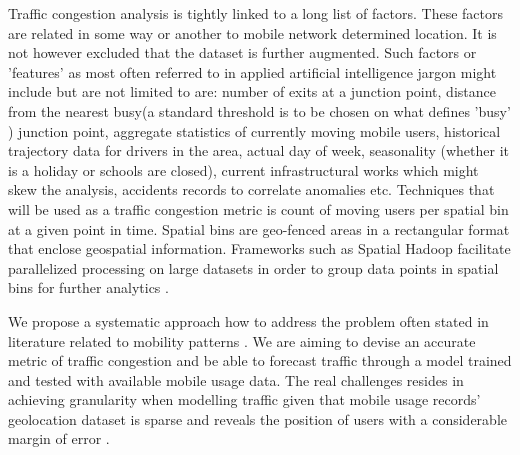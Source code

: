 \documentclass[12pt, a4paper]{report}
\theoremstyle{definition}
\theoremstyle{definition}%
\theoremstyle{definition}%
\theoremstyle{definition}%
\theoremstyle{definition}%
\theoremstyle{definition}%
\begin{document}
Traffic congestion analysis is tightly linked to a long list of factors. These factors are related in some way or another to mobile network determined location. It is not however excluded that the dataset is further augmented. Such factors or 'features' as most often referred to in applied artificial intelligence jargon might include but are not limited to are: number of exits at a junction point, distance from the nearest busy(a standard threshold is to be chosen on what defines 'busy' ) junction point, aggregate statistics of currently moving mobile users, historical trajectory data for drivers in the area, actual day of week, seasonality (whether it is a holiday or schools are closed), current infrastructural works which might skew the analysis, accidents records to correlate anomalies etc. Techniques that will be used as a traffic congestion metric is count of moving users per spatial bin at a given point in time\cite{Alarabi2014}. Spatial bins are geo-fenced areas in a rectangular format that enclose geospatial information. Frameworks such as Spatial Hadoop facilitate parallelized processing on large datasets in order to group data points in spatial bins for further analytics \cite{Alarabi2014}. 

We propose a systematic approach how to address the problem often stated in literature related to mobility patterns \cite{Calabrese2013,Toole2015,Hoteit2014,Alexander2015}. We are aiming to devise an accurate metric of traffic congestion and be able to forecast traffic through a model trained and tested with available mobile usage data. The real challenges resides in achieving granularity when modelling traffic given that mobile usage records' geolocation dataset is sparse and reveals the position of users with a considerable margin of error \cite{Hoteit2014,Gonzalez2008}.
\end{document}
